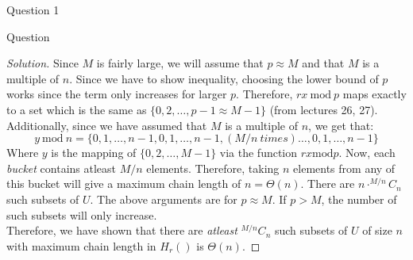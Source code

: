\begin{solution}{Question 1}\label{ques:1}
    \begin{question}
        Question
    \end{question}
    \tcblower{}
    \begin{proof}[Solution]
      Since $M$ is fairly large, we will assume that $p \approx M$ and that $M$ is a multiple of $n$. Since we have to show inequality, choosing the lower bound of $p$ works since the term only increases for larger $p$. Therefore, $rx\ \text{mod}\ p$ maps exactly to a set which is the same as $\{0, 2, \ldots, p-1 \approx M-1\}$ (from lectures 26, 27). Additionally, since we have assumed that $M$ is a multiple of $n$, we get that:
      \begin{equation}
        y\ \text{mod}\ n = \{0, 1, \ldots, n-1, 0, 1, \ldots, n-1, (M/n\ times)\ldots, 0, 1, \ldots, n-1\}
      \end{equation}
      Where $y$ is the mapping of $\{0, 2, \ldots, M-1\}$ via the function $rx \text{mod} p$. Now, each \textit{bucket} contains atleast $M/n$ elements. Therefore, taking $n$ elements from any of this bucket will give a maximum chain length of $n = \Theta(n)$. There are $n\cdot^{M/n}C_n$ such subsets of $U$. The above arguments are for $p \approx M$. If $p > M$, the number of such subsets will only increase.\\
      Therefore, we have shown that there are \textit{atleast} $^{M/n}C_n$ such subsets of $U$ of size $n$ with maximum chain length in $H_r()$ is $\Theta(n)$.
    \end{proof}
\end{solution}
